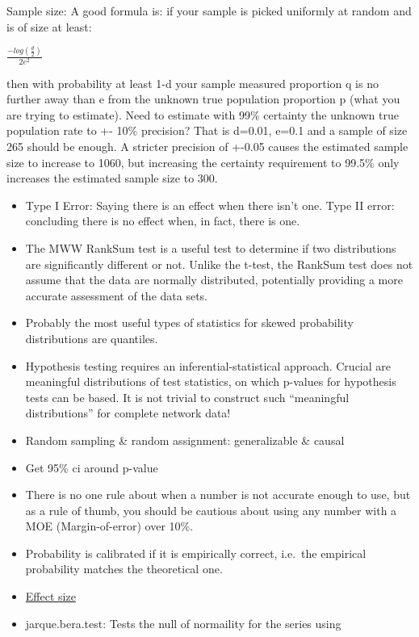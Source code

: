 \documentclass[]{book}
\theoremstyle{definition}
\theoremstyle{definition}
\theoremstyle{definition}
\theoremstyle{remark}
\begin{document}
Sample size: A good formula is: if your sample is picked uniformly at
random and is of size at least:

\(\frac{-log(\frac{d}{2})}{2e^2}\)

then with probability at least 1-d your sample measured proportion q is
no further away than e from the unknown true population proportion p
(what you are trying to estimate). Need to estimate with 99\% certainty
the unknown true population rate to +- 10\% precision? That is d=0.01,
e=0.1 and a sample of size 265 should be enough. A stricter precision of
+-0.05 causes the estimated sample size to increase to 1060, but
increasing the certainty requirement to 99.5\% only increases the
estimated sample size to 300.

\begin{itemize}
\item
  Type I Error: Saying there is an effect when there isn't one. Type II
  error: concluding there is no effect when, in fact, there is one.
\item
  The MWW RankSum test is a useful test to determine if two
  distributions are significantly different or not. Unlike the t-test,
  the RankSum test does not assume that the data are normally
  distributed, potentially providing a more accurate assessment of the
  data sets.
\item
  Probably the most useful types of statistics for skewed probability
  distributions are quantiles.
\item
  Hypothesis testing requires an inferential-statistical approach.
  Crucial are meaningful distributions of test statistics, on which
  p-values for hypothesis tests can be based. It is not trivial to
  construct such ``meaningful distributions'' for complete network data!
\item
  Random sampling \& random assignment: generalizable \& causal
\item
  Get 95\% ci around p-value
\item
  There is no one rule about when a number is not accurate enough to
  use, but as a rule of thumb, you should be cautious about using any
  number with a MOE (Margin-of-error) over 10\%.
\item
  Probability is calibrated if it is empirically correct, i.e.~the
  empirical probability matches the theoretical one.
\item
  \href{https://artax.karlin.mff.cuni.cz/r-help/library/lsr/html/cohensD.html}{Effect
  size}
\item
  jarque.bera.test: Tests the null of normaility for the series using

\end{itemize}
\end{document}
